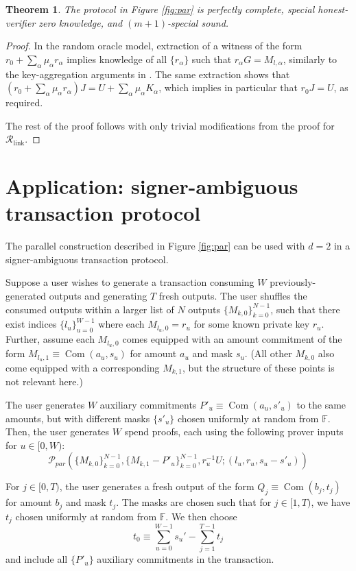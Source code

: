 \documentclass{article}
\newcommand{\F}{\mathbb{F}}
\newcommand{\com}{\operatorname{Com}}
\newtheorem{theorem}{Theorem}
\theoremstyle{definition}
\begin{document}
\begin{theorem}
The protocol in Figure \ref{fig:par} is perfectly complete, special honest-verifier zero knowledge, and $(m+1)$-special sound.
\end{theorem}

\begin{proof}
In the random oracle model, extraction of a witness of the form $r_0 + \sum_{\alpha} \mu_\alpha r_\alpha$ implies knowledge of all $\{r_\alpha\}$ such that $r_\alpha G = M_{l,\alpha}$, similarly to the key-aggregation arguments in \cite{musig}.
The same extraction shows that $\left(r_0 + \sum_{\alpha} \mu_\alpha r_\alpha\right)J = U + \sum_{\alpha} \mu_\alpha K_\alpha$, which implies in particular that $r_0J = U$, as required.

The rest of the proof follows with only trivial modifications from the proof for $\mathcal{R}_{\text{link}}$.
\end{proof}


\section{Application: signer-ambiguous transaction protocol}
The parallel construction described in Figure \ref{fig:par} can be used with $d = 2$ in a signer-ambiguous transaction protocol.

Suppose a user wishes to generate a transaction consuming $W$ previously-generated outputs and generating $T$ fresh outputs.
The user shuffles the consumed outputs within a larger list of $N$ outputs $\{M_{k,0}\}_{k=0}^{N-1}$, such that there exist indices $\{l_u\}_{u=0}^{W-1}$ where each $M_{l_u,0} = r_u$ for some known private key $r_u$.
Further, assume each $M_{l_u,0}$ comes equipped with an amount commitment of the form $M_{l_u,1} \equiv \com(a_u,s_u)$ for amount $a_u$ and mask $s_u$.
(All other $M_{k,0}$ also come equipped with a corresponding $M_{k,1}$, but the structure of these points is not relevant here.)

The user generates $W$ auxiliary commitments $P'_u \equiv \com(a_u,s'_u)$ to the same amounts, but with different masks $\{s'_u\}$ chosen uniformly at random from $\F$.
Then, the user generates $W$ spend proofs, each using the following prover inputs for $u \in [0,W)$:
$$\mathcal{P}_{par}(\{M_{k,0}\}_{k=0}^{N-1},\{M_{k,1}-P'_u\}_{k=0}^{N-1},r_u^{-1}U;(l_u,r_u,s_u-s'_u))$$

For $j \in [0,T)$, the user generates a fresh output of the form $Q_j \equiv \com(b_j,t_j)$ for amount $b_j$ and mask $t_j$.
The masks are chosen such that for $j \in [1,T)$, we have $t_j$ chosen uniformly at random from $\F$.
We then choose $$t_0 \equiv \sum_{u=0}^{W-1} s_u' -\sum_{j=1}^{T-1} t_j$$ and include all $\{P'_u\}$ auxiliary commitments in the transaction.
\end{document}
